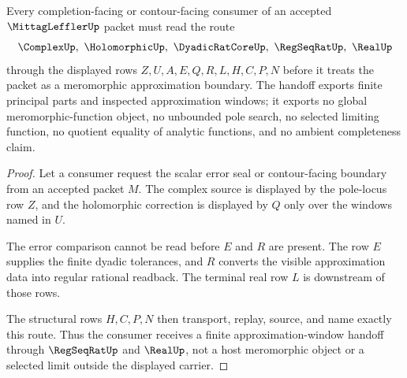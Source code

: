 \begin{theorem}
\label{thm:mittag-leffler-regseqrat-handoff}
Every completion-facing or contour-facing consumer of an accepted $\MittagLefflerUp$ packet must read the route
$$
\ComplexUp,\ \HolomorphicUp,\ \DyadicRatCoreUp,\ \RegSeqRatUp,\ \RealUp
$$
through the displayed rows $Z,U,A,E,Q,R,L,H,C,P,N$ before it treats the packet as a meromorphic approximation boundary. The handoff exports finite principal parts and inspected approximation windows; it exports no global meromorphic-function object, no unbounded pole search, no selected limiting function, no quotient equality of analytic functions, and no ambient completeness claim.
\end{theorem}
\begin{proof}
Let a consumer request the scalar error seal or contour-facing boundary from an accepted packet $M$. The complex source is displayed by the pole-locus row $Z$, and the holomorphic correction is displayed by $Q$ only over the windows named in $U$.

The error comparison cannot be read before $E$ and $R$ are present. The row $E$ supplies the finite dyadic tolerances, and $R$ converts the visible approximation data into regular rational readback. The terminal real row $L$ is downstream of those rows.

The structural rows $H,C,P,N$ then transport, replay, source, and name exactly this route. Thus the consumer receives a finite approximation-window handoff through $\RegSeqRatUp$ and $\RealUp$, not a host meromorphic object or a selected limit outside the displayed carrier.
\end{proof}




